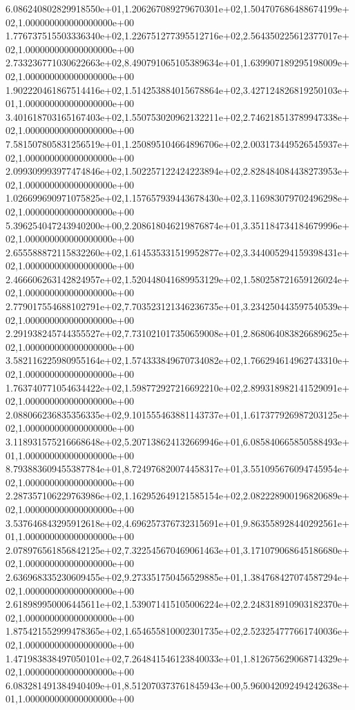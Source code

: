 6.086240802829918550e+01,1.206267089279670301e+02,1.504707686488674199e+02,1.000000000000000000e+00
1.776737515503336340e+02,1.226751277395512716e+02,2.564350225612377017e+02,1.000000000000000000e+00
2.733236771030622663e+02,8.490791065105389634e+01,1.639907189295198009e+02,1.000000000000000000e+00
1.902220461867514416e+02,1.514253884015678864e+02,3.427124826819250103e+01,1.000000000000000000e+00
3.401618703165167403e+02,1.550753020962132211e+02,2.746218513789947338e+02,1.000000000000000000e+00
7.581507805831256519e+01,1.250895104664896706e+02,2.003173449526545937e+02,1.000000000000000000e+00
2.099309993977474846e+02,1.502257122424223894e+02,2.828484084438273953e+02,1.000000000000000000e+00
1.026699690971075825e+02,1.157657939443678430e+02,3.116983079702496298e+02,1.000000000000000000e+00
5.396254047243940200e+00,2.208618046219876874e+01,3.351184734184679996e+02,1.000000000000000000e+00
2.655588872115832260e+02,1.614535331519952877e+02,3.344005294159398431e+02,1.000000000000000000e+00
2.466606263142824957e+02,1.520448041689953129e+02,1.580258721659126024e+02,1.000000000000000000e+00
2.779017554688102791e+02,7.703523121346236735e+01,3.234250443597540539e+02,1.000000000000000000e+00
2.291938245744355527e+02,7.731021017350659008e+01,2.868064083826689625e+02,1.000000000000000000e+00
3.582116225980955164e+02,1.574333849670734082e+02,1.766294614962743310e+02,1.000000000000000000e+00
1.763740771054634422e+02,1.598772927216692210e+02,2.899318982141529091e+02,1.000000000000000000e+00
2.088066236835356335e+02,9.101555463881143737e+01,1.617377926987203125e+02,1.000000000000000000e+00
3.118931575216668648e+02,5.207138624132669946e+01,6.085840665850588493e+01,1.000000000000000000e+00
8.793883609455387784e+01,8.724976820074458317e+01,3.551095676094745954e+02,1.000000000000000000e+00
2.287357106229763986e+02,1.162952649121585154e+02,2.082228900196820689e+02,1.000000000000000000e+00
3.537646843295912618e+02,4.696257376732315691e+01,9.863558928440292561e+01,1.000000000000000000e+00
2.078976561856842125e+02,7.322545670469061463e+01,3.171079068645186680e+02,1.000000000000000000e+00
2.636968335230609455e+02,9.273351750456529885e+01,1.384768427074587294e+02,1.000000000000000000e+00
2.618989950006445611e+02,1.539071415105006224e+02,2.248318910903182370e+02,1.000000000000000000e+00
1.875421552999478365e+02,1.654655810002301735e+02,2.523254777661740036e+02,1.000000000000000000e+00
1.471983838497050101e+02,7.264841546123840033e+01,1.812675629068714329e+02,1.000000000000000000e+00
6.083281491384940409e+01,8.512070373761845943e+00,5.960042092494242638e+01,1.000000000000000000e+00
